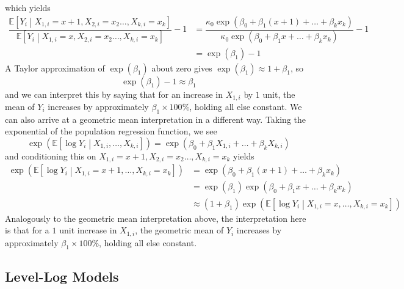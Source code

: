 \documentclass[11pt]{report} %
\begin{document}
which yields
\begin{align}
\dfrac{\mathbb{E}\left[Y_{i}\middle|X_{1,i}=x+1,X_{2,i}=x_{2}\dots,X_{k,i}=x_{k}\right]}{\mathbb{E}\left[Y_{i}\middle|X_{1,i}=x,X_{2,i}=x_{2}\dots,X_{k,i}=x_{k}\right]}-1 &= \dfrac{\kappa_{0}\exp\left(\beta_{0}+\beta_{1}\left(x+1\right)+\dots+\beta_{k}x_{k}\right)}{\kappa_{0}\exp\left(\beta_{0}+\beta_{1}x+\dots+\beta_{k}x_{k}\right)}-1 \\
&= \exp\left(\beta_{1}\right) - 1
\end{align}
A Taylor approximation of $\exp\left(\beta_{1}\right)$ about zero gives $\exp\left(\beta_{1}\right) \approx 1 + \beta_{1}$, so
\begin{equation}
\exp\left(\beta_{1}\right) - 1 \approx \beta_{1}
\end{equation}
and we can interpret this by saying that for an increase in $X_{1, i}$ by $1$ unit, the mean of $Y_{i}$ increases by approximately $\beta_{1}\times 100\%$, holding all else constant. We can also arrive at a geometric mean interpretation in a different way. Taking the exponential of the population regression function, we see
\begin{equation}
\exp\left(\mathbb{E}\left[\log Y_{i}\middle|X_{1,i},\dots,X_{k,i}\right]\right)=\exp\left(\beta_{0}+\beta_{1}X_{1,i}+\dots+\beta_{k}X_{k,i}\right)
\end{equation}
and conditioning this on $X_{1,i}=x+1,X_{2,i}=x_{2}\dots,X_{k,i}=x_{k}$ yields
\begin{align}
\exp\left(\mathbb{E}\left[\log Y_{i}\middle|X_{1,i}=x+1,\dots,X_{k,i}=x_{k}\right]\right) &= \exp\left(\beta_{0}+\beta_{1}\left(x+1\right)+\dots+\beta_{k}x_{k}\right) \\
&= \exp\left(\beta_{1}\right)\exp\left(\beta_{0}+\beta_{1}x+\dots+\beta_{k}x_{k}\right) \\
&\approx \left(1+\beta_{1}\right)\exp\left(\mathbb{E}\left[\log Y_{i}\middle|X_{1,i}=x,\dots,X_{k,i}=x_{k}\right]\right)
\end{align}
Analogously to the geometric mean interpretation above, the interpretation here is that for a $1$ unit increase in $X_{1, i}$, the geometric mean of $Y_{i}$ increases by approximately $\beta_{1}\times 100\%$, holding all else constant.

\subsection{Level-Log Models}
\end{document}
